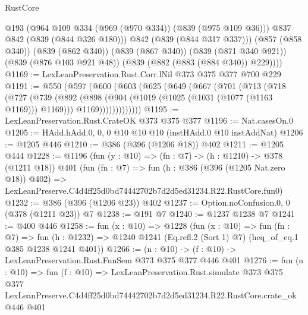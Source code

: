 \begin{lexlean}{RustCore}
\begin{coremodule}
            @193
            (@964 @109 @334 (@969 (@970 @334)) (@839 (@975 @109 @36)))
            @837
            @842
            (@839 (@844 @326 @180)))
          @842
          (@839 (@844 @317 @337)))
        (@857 (@858 @340))
        (@839 (@862 @340))
        (@839 (@867 @340))
        (@839 (@871 @340 @921))
        (@839 (@876 @103 @921 @48))
        (@839 (@882 (@883 (@884 @340)) @229))))
@1169 := LexLeanPreservation.Rust.Corr.lNil @373 @375 @377 @700 @229
@1191 := @550
    (@597
      (@600
        (@603
          (@625
            (@649
              (@667
                (@701
                  (@713
                    (@718
                      (@727
                        (@739
                          (@892
                            (@898
                              (@904 (@1019 (@1025 (@1031 (@1077 (@1163 @1169))) @1169)))
                              @1169)))))))))))))
@1195 := LexLeanPreservation.Rust.CrateOK @373 @375 @377
@1196 := Nat.casesOn.{0}
@1205 := HAdd.hAdd.{0, 0, 0} @10 @10 @10 (instHAdd.{0} @10 instAddNat)
@1206 := @1205 @446
@1210 := @386 (@396 (@1206 @18)) @402
@1211 := @1205 @444
@1228 := @1196
    (fun (y : @10) => (fn : @7) -> (h : @1210) -> @378 (@1211 @18))
    @401
    (fun (fn : @7) =>
    fun (h : @386 (@396 (@1205 Nat.zero @18)) @402) =>
    LexLeanPreserve.C4d4ff25d0bd74442702b7d2d5ed31234.R22.RustCore.fun0)
@1232 := @386 (@396 (@1206 @23)) @402
@1237 := Option.noConfusion.{0, 0} (@378 (@1211 @23)) @7
@1238 := @191 @7
@1240 := @1237 @1238 @7
@1241 := @400 @446
@1258 := fun (x : @10) =>
  @1228
    (fun (x : @10) =>
    fun (fn : @7) =>
    fun (h : @1232) => @1240 @1241 (Eq.refl.{2} (Sort 1) @7) (heq_of_eq.{1} @385 @1238 @1241 @401))
@1266 := (n : @10) -> (f : @10) -> LexLeanPreservation.Rust.FunSem @373 @375 @377 @446 @401
@1276 := fun (n : @10) =>
  fun (f : @10) =>
  LexLeanPreservation.Rust.simulate
    @373
    @375
    @377
    LexLeanPreserve.C4d4ff25d0bd74442702b7d2d5ed31234.R22.RustCore.crate_ok
    @446
    @401
\end{coremodule}
\end{lexlean}

